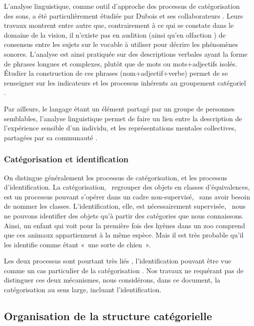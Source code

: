 L'analyse linguistique, comme outil d'approche des processus de catégorisation des sons, a été particulièrement étudiée par Dubois et ses collaborateurs \citep{dubois2000categories,raimbault2005urban,dubois2006cognitive,guastavino2006ideal}. Leurs travaux montrent entre autre que, contrairement à ce qui se constate dans le domaine de la vision, il n'existe pas en audition (ainsi qu'en olfaction \citep{dubois2000categories}) de consensus entre les sujets sur le vocable à utiliser pour décrire les phénomènes sonores. L'analyse est ainsi pratiquée sur des descriptions verbales ayant la forme de phrases longues et complexes, plutôt que de mots ou mots+adjectifs isolés. Étudier la construction de ces phrases (nom+adjectif+verbe) permet de se renseigner sur les indicateurs et les processus inhérents au groupement catégoriel \citep{dubois2000categories,guastavino2006ideal}.

Par ailleurs, le langage étant un élément partagé par un groupe de personnes semblables, l'analyse linguistique permet de faire un lien entre la description de l'expérience sensible d'un individu, et les représentations mentales collectives, partagées par sa communauté \citep{dubois2000categories}.

\subsubsection{Catégorisation et identification}

On distingue généralement les processus de catégorisation, et les processus d'identification. La catégorisation, \ie~regrouper des objets en classes d'équivalences, est un processus pouvant s'opérer dans un cadre non-supervisé, \ie~sans avoir besoin de nommer les classes. L'identification, elle, est nécessairement supervisée, \ie~nous ne pouvons identifier des objets qu'à partir des catégories que nous connaissons. Ainsi, un enfant qui voit pour la première fois des hyènes dans un zoo comprend que ces animaux appartiennent à la même espèce. Mais il est très probable qu'il les identifie comme étant «~une sorte de chien~».

Les deux processus sont pourtant très liés \citep{goldstone2003concepts}, l'identification pouvant être vue comme un cas particulier de la catégorisation \citep{schyns1998diagnostic}. Nos travaux ne requérant pas de distinguer ces deux mécanismes, nous considérons, dans ce document, la catégorisation au sens large, incluant l'identification.

\subsection{Organisation de la structure catégorielle}

